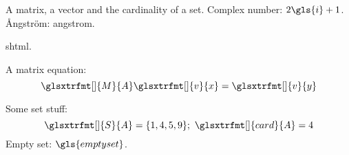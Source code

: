 \documentclass{report}
\newcommand{\gmtx}[2][]{\glsxtrfmt[#1]{M}{#2}}
\newcommand{\gvec}[2][]{\glsxtrfmt[#1]{v}{#2}}
\newcommand{\gset}[2][]{\glsxtrfmt[#1]{S}{#2}}
\newcommand{\gcard}[2][]{\glsxtrfmt[#1]{card}{#2}}
\begin{document}
A \gls{matrix}, a \gls{vector} and the \gls{cardinality}
of a \gls{set}. Complex number: $2\gls{i}+1$.
\AA ngstr\"om: \gls{angstrom}.

\gls{shtml}.

A \gls{matrix} equation:
\[
 \gmtx{A}\gvec{x} = \gvec{y}
\]

Some \gls{set} stuff:
\[
 \gset{A} = \{1, 4, 5, 9\};\ \gcard{A} = 4
\]
Empty set: $\gls{emptyset}$.

\printunsrtglossaries
\end{document}
